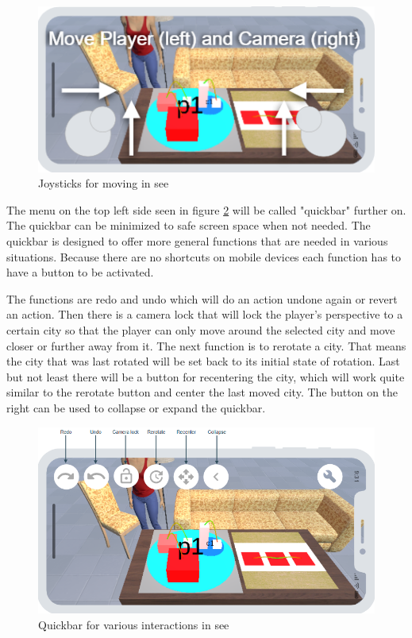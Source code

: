 \begin{figure}[htb]
    \centering
    \includegraphics[width=1\textwidth]{Concept/img/joystick.png}
    \caption{Joysticks for moving in \gls{see}}\label{fig:joystick_prototype}
\end{figure}

The menu on the top left side seen in figure \ref{fig:quickbar} will be called "quickbar" further on. 
The quickbar can be minimized to safe screen space when not needed. 
The quickbar is designed to offer more general functions that are needed in various situations.
Because there are no shortcuts on mobile devices each function has to have a button to be activated.

The functions are redo and undo which will do an action undone again or revert an action.
Then there is a camera lock that will lock the player's perspective to a certain \gls{city} so that the player can only move around the selected city and move closer or further away from it.
The next function is to rerotate a \gls{city}.
That means the \gls{city} that was last rotated will be set back to its initial state of rotation.
Last but not least there will be a button for recentering the city, which will work quite similar to the rerotate button and center the last moved \gls{city}.
The button on the right can be used to collapse or expand the quickbar.
\begin{figure}[htb]
    \centering
    \includegraphics[width=1\textwidth]{Concept/img/quickbar.png}
    \caption{Quickbar for various interactions in \gls{see}}\label{fig:quickbar}
\end{figure}

